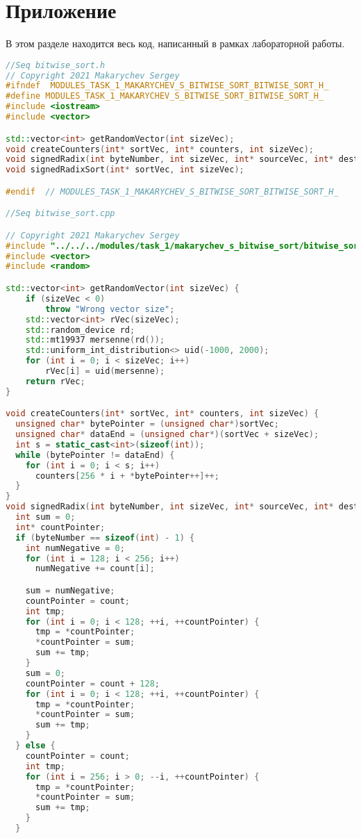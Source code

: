 \documentclass{report}
\begin{document}
\section*{Приложение}
В этом разделе находится весь код, написанный в рамках лабораторной работы.
\begin{lstlisting}[language=C++]
//Seq bitwise_sort.h
// Copyright 2021 Makarychev Sergey
#ifndef  MODULES_TASK_1_MAKARYCHEV_S_BITWISE_SORT_BITWISE_SORT_H_
#define MODULES_TASK_1_MAKARYCHEV_S_BITWISE_SORT_BITWISE_SORT_H_
#include <iostream>
#include <vector>

std::vector<int> getRandomVector(int sizeVec);
void createCounters(int* sortVec, int* counters, int sizeVec);
void signedRadix(int byteNumber, int sizeVec, int* sourceVec, int* destVec, int* count);
void signedRadixSort(int* sortVec, int sizeVec);

#endif  // MODULES_TASK_1_MAKARYCHEV_S_BITWISE_SORT_BITWISE_SORT_H_

//Seq bitwise_sort.cpp

// Copyright 2021 Makarychev Sergey
#include "../../../modules/task_1/makarychev_s_bitwise_sort/bitwise_sort.h"
#include <vector>
#include <random>

std::vector<int> getRandomVector(int sizeVec) {
    if (sizeVec < 0)
        throw "Wrong vector size";
    std::vector<int> rVec(sizeVec);
    std::random_device rd;
    std::mt19937 mersenne(rd());
    std::uniform_int_distribution<> uid(-1000, 2000);
    for (int i = 0; i < sizeVec; i++)
        rVec[i] = uid(mersenne);
    return rVec;
}

void createCounters(int* sortVec, int* counters, int sizeVec) {
  unsigned char* bytePointer = (unsigned char*)sortVec;
  unsigned char* dataEnd = (unsigned char*)(sortVec + sizeVec);
  int s = static_cast<int>(sizeof(int));
  while (bytePointer != dataEnd) {
    for (int i = 0; i < s; i++)
      counters[256 * i + *bytePointer++]++;
  }
}
void signedRadix(int byteNumber, int sizeVec, int* sourceVec, int* destVec, int* count) {
  int sum = 0;
  int* countPointer;
  if (byteNumber == sizeof(int) - 1) {
    int numNegative = 0;
    for (int i = 128; i < 256; i++)
      numNegative += count[i];

    sum = numNegative;
    countPointer = count;
    int tmp;
    for (int i = 0; i < 128; ++i, ++countPointer) {
      tmp = *countPointer;
      *countPointer = sum;
      sum += tmp;
    }
    sum = 0;
    countPointer = count + 128;
    for (int i = 0; i < 128; ++i, ++countPointer) {
      tmp = *countPointer;
      *countPointer = sum;
      sum += tmp;
    }
  } else {
    countPointer = count;
    int tmp;
    for (int i = 256; i > 0; --i, ++countPointer) {
      tmp = *countPointer;
      *countPointer = sum;
      sum += tmp;
    }
  }


\end{lstlisting}
\end{document}
